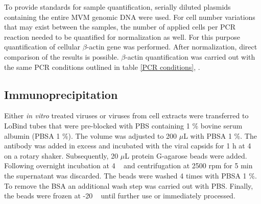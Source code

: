 To provide standards for sample quantification, serially diluted plasmids containing the entire MVM genomic DNA were used.
For cell number variations that may exist between the samples, the number of applied cells per PCR reaction needed to be quantified for normalization as well. For this purpose quantification of cellular $\beta$-actin gene was performed. After normalization, direct comparison of the results is possible. $\beta$-actin quantification was carried out with the same PCR conditions outlined in table \ref{PCR conditions}, \pageref{PCR conditions}.



\subsection{Immunoprecipitation}
Either \textit{in vitro} treated viruses or viruses from cell extracts were transferred to LoBind tubes that were pre-blocked with PBS containing 1 \% bovine serum albumin (PBSA 1 \%). The volume was adjusted to 200 $\mu$L with PBSA 1 \%. The antibody was added in excess and incubated with the viral capsids for 1 h at 4 \textcelsius~ on a rotary shaker. Subsequently, 20 $\mu$L protein G-agarose beads were added. Following overnight incubation at 4 \textcelsius~ and centrifugation at 2500 rpm for 5 min the supernatant was discarded. The beads were washed 4 times with PBSA 1 \%. To remove the BSA an additional wash step was carried out with PBS. Finally, the beads were frozen at -20 \textcelsius~ until further use or immediately processed. 


\subsection{}
 


\section{}


\subsection{}



\subsection{}


